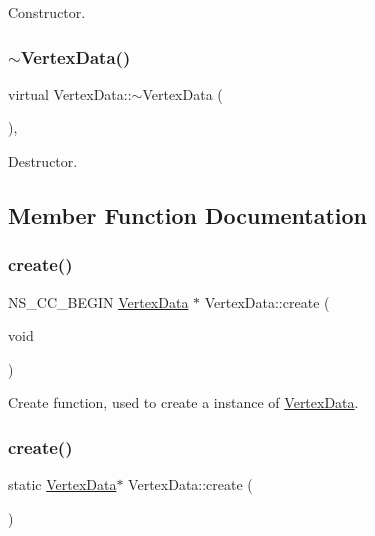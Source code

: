Constructor. \mbox{\label{classVertexData_acc9d1644da6e2b00f81c8bac1cd06960}} 
\subsubsection{\texorpdfstring{$\sim$\+Vertex\+Data()}{~VertexData()}\hspace{0.1cm}{\footnotesize\ttfamily [2/2]}}
{\footnotesize\ttfamily virtual Vertex\+Data\+::$\sim$\+Vertex\+Data (\begin{DoxyParamCaption}{ }\end{DoxyParamCaption})\hspace{0.3cm}{\ttfamily [protected]}, {\ttfamily [virtual]}}

Destructor. 

\subsection{Member Function Documentation}
\mbox{\label{classVertexData_ad87e3c945044fac9f2cef09317fb9ccb}} 
\subsubsection{\texorpdfstring{create()}{create()}\hspace{0.1cm}{\footnotesize\ttfamily [1/2]}}
{\footnotesize\ttfamily N\+S\+\_\+\+C\+C\+\_\+\+B\+E\+G\+IN \hyperlink{classVertexData}{Vertex\+Data} $\ast$ Vertex\+Data\+::create (\begin{DoxyParamCaption}\item[{void}]{ }\end{DoxyParamCaption})\hspace{0.3cm}{\ttfamily [static]}}

Create function, used to create a instance of \hyperlink{classVertexData}{Vertex\+Data}. \mbox{\label{classVertexData_af77ed761106e9859e52add75359d3387}} 
\subsubsection{\texorpdfstring{create()}{create()}\hspace{0.1cm}{\footnotesize\ttfamily [2/2]}}
{\footnotesize\ttfamily static \hyperlink{classVertexData}{Vertex\+Data}$\ast$ Vertex\+Data\+::create (\begin{DoxyParamCaption}{ }\end{DoxyParamCaption})\hspace{0.3cm}{\ttfamily [static]}}

